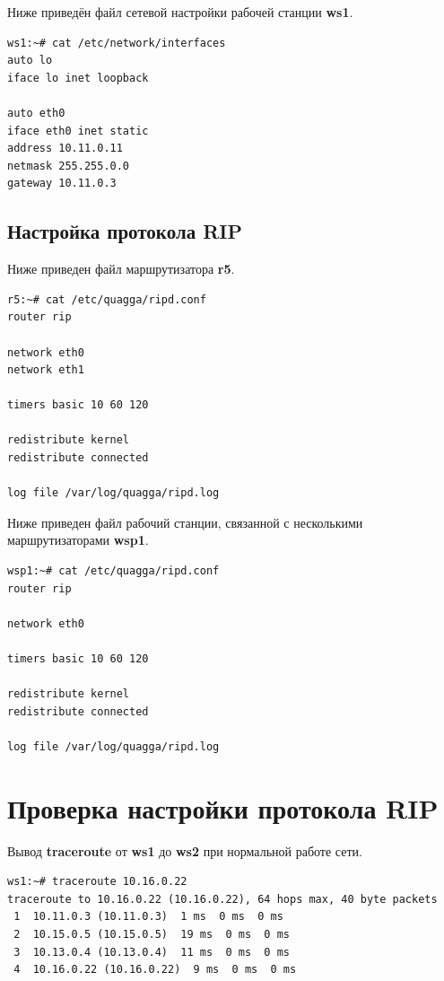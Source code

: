 \documentclass[a4paper,12pt]{article}
\begin{document}
Ниже приведён файл сетевой настройки рабочей станции \textbf{ws1}.

\begin{Verbatim}
ws1:~# cat /etc/network/interfaces 
auto lo
iface lo inet loopback

auto eth0
iface eth0 inet static
address 10.11.0.11
netmask 255.255.0.0
gateway 10.11.0.3
\end{Verbatim}


\subsection{Настройка протокола RIP}

Ниже приведен файл  маршрутизатора \textbf{r5}.

\begin{Verbatim}
r5:~# cat /etc/quagga/ripd.conf
router rip

network eth0
network eth1

timers basic 10 60 120

redistribute kernel
redistribute connected

log file /var/log/quagga/ripd.log
\end{Verbatim}


Ниже приведен файл  рабочий станции, связанной с несколькими маршрутизаторами \textbf{wsp1}.

\begin{Verbatim}
wsp1:~# cat /etc/quagga/ripd.conf
router rip

network eth0

timers basic 10 60 120

redistribute kernel
redistribute connected

log file /var/log/quagga/ripd.log
\end{Verbatim}


\section{Проверка настройки протокола RIP}

Вывод \textbf{traceroute} от \textbf{ws1} до \textbf{ws2} при нормальной работе сети.

\begin{Verbatim}
ws1:~# traceroute 10.16.0.22
traceroute to 10.16.0.22 (10.16.0.22), 64 hops max, 40 byte packets
 1  10.11.0.3 (10.11.0.3)  1 ms  0 ms  0 ms
 2  10.15.0.5 (10.15.0.5)  19 ms  0 ms  0 ms
 3  10.13.0.4 (10.13.0.4)  11 ms  0 ms  0 ms
 4  10.16.0.22 (10.16.0.22)  9 ms  0 ms  0 ms
\end{Verbatim}
\end{document}
